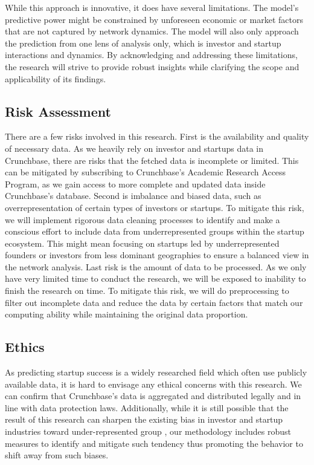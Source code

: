 \documentclass[a4paper,11pt]{article}
\begin{document}
While this approach is innovative, it does have several limitations.
The model’s predictive power might be constrained by unforeseen economic or market factors that are not captured by network dynamics. The model will also only approach the prediction from one lens of analysis only, which is investor and startup interactions and dynamics. By acknowledging and addressing these limitations, the research will strive to provide robust insights while clarifying the scope and applicability of its findings.

\subsection{Risk Assessment}
There are a few risks involved in this research. First is the availability and quality of necessary data. As we heavily rely on investor and startups data in Crunchbase, there are risks that the fetched data is incomplete or limited. This can be mitigated by subscribing to Crunchbase's Academic Research Access Program, as we gain access to more complete and updated data inside Crunchbase's database. Second is imbalance and biased data, such as overrepresentation of certain types of investors or startups. To mitigate this risk, we will implement rigorous data cleaning processes to identify and make a conscious effort to include data from underrepresented groups within the startup ecosystem. This might mean focusing on startups led by underrepresented founders or investors from less dominant geographies to ensure a balanced view in the network analysis. Last risk is the amount of data to be processed. As we only have very limited time to conduct the research, we will be exposed to inability to finish the research on time. To mitigate this risk, we will do preprocessing to filter out incomplete data and reduce the data by certain factors that match our computing ability while maintaining the original data proportion.

\subsection{Ethics}
As predicting startup success is a widely researched field which often use publicly available data, it is hard to envisage any ethical concerns with this research. We can confirm that Crunchbase's data is aggregated and distributed legally and in line with data protection laws. Additionally, while it is still possible that the result of this research can sharpen the existing bias in investor and startup industries toward under-represented group \cite{ewens2020a} \cite{cumming2007a}, our methodology includes robust measures to identify and mitigate such tendency thus promoting the behavior to shift away from such biases.
\end{document}
